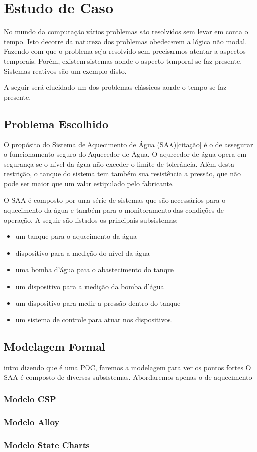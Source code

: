 \section{Estudo de Caso}
No mundo da computação vários problemas são resolvidos sem levar em conta o tempo. 
Isto decorre da natureza dos problemas obedecerem a lógica não modal. Fazendo com que o 
problema seja resolvido sem precisarmos atentar a aspectos temporais. Porém, existem sistemas aonde
o aspecto temporal se faz presente. Sistemas reativos são um exemplo disto.

A seguir será elucidado um dos problemas clássicos aonde o tempo se faz presente.
\subsection{Problema Escolhido}
O propósito do Sistema de Aquecimento de Água (SAA)[citação] é o de assegurar o funcionamento 
seguro do Aquecedor de Água. O aquecedor de água opera em segurança se o nível da água
não exceder o limíte de tolerância. Além desta restrição, o tanque do sistema tem também 
sua resistência a pressão, que não pode ser maior que um valor estipulado pelo fabricante.

O SAA é composto por uma série de sistemas que são necessários para o aquecimento da água e também
para o monitoramento das condições de operação. A seguir são listados os principais subsistemas:
\begin{itemize}
\item um tanque para o aquecimento da água
\item dispositivo para a medição do nível da água
\item uma bomba d'água para o abastecimento do tanque
\item um dispositivo para a medição da bomba d'água
\item um dispositivo para medir a pressão dentro do tanque
\item um sistema de controle para atuar nos dispositivos.
\end{itemize}

\subsection{Modelagem Formal}
intro dizendo que é uma POC, faremos a modelagem para ver os pontos fortes
O SAA é composto de diversos subsistemas. Abordaremos apenas o de aquecimento
\subsubsection{Modelo CSP}
\subsubsection{Modelo Alloy}
\subsubsection{Modelo State Charts}
